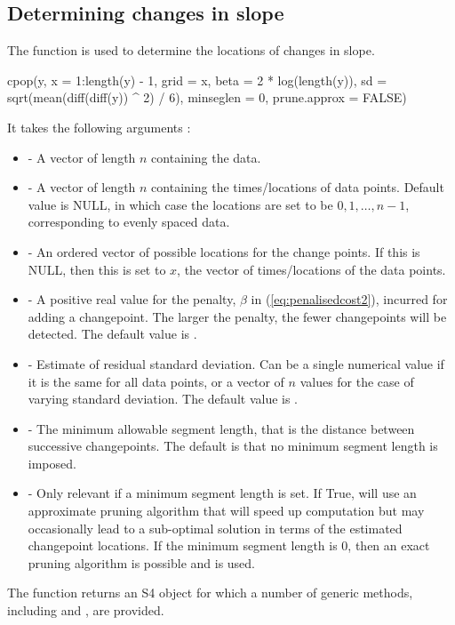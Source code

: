 \documentclass[article]{jss}
\begin{document}
\subsection{Determining changes in slope}
%
%
The function  is used to determine the locations of changes in slope.
%
%
\begin{CodeInput}
cpop(y, x = 1:length(y) - 1, grid = x, beta = 2 * log(length(y)), 
    sd =  sqrt(mean(diff(diff(y)) ^ 2) / 6), minseglen = 0, 
    prune.approx = FALSE)
\end{CodeInput}
It takes the following arguments :
%
%
\begin{itemize}
 \item  {} - A vector of length $n$ containing the data.
\item {} -  A vector of length $n$ containing the times/locations of data points. Default value is NULL, in which case the locations are set to be $0,1,\ldots,n-1$, corresponding to evenly spaced data.
\item {} -  An ordered vector of possible locations for the change points. If this is NULL, then this is set to $x$, the vector of times/locations of the data points.
\item {} -  A positive real value for the penalty, $\beta$ in (\ref{eq:penalisedcost2}), incurred for adding a changepoint. The larger the penalty, the fewer changepoints will be detected. The default value is .
\item {} - Estimate of residual standard deviation. Can be a single numerical value if it is the same for all data points, or a vector of $n$ values for the case of varying standard deviation. The default value is .
\item {} -  The minimum allowable segment length, that is the distance between successive changepoints. The default is that no minimum segment length is imposed.
\item {} -  Only relevant if a minimum segment length is set. If True,  will use an approximate pruning algorithm that will speed up computation but may occasionally lead to a sub-optimal solution in terms of the estimated changepoint locations. If the minimum segment length is 0, then an exact pruning algorithm is possible and is used.
\end{itemize}
The  function returns an S4 object for which a number of generic methods, including  and , are provided. 
\end{document}
